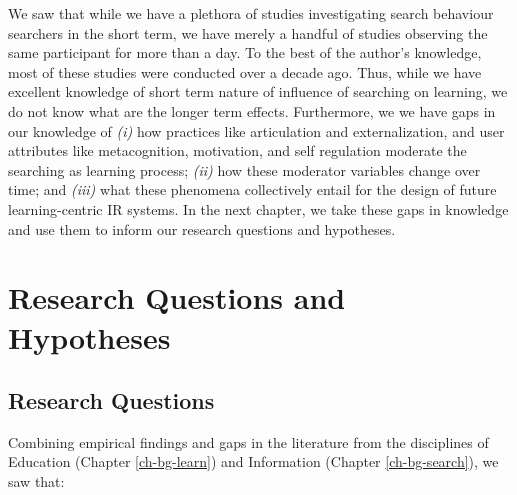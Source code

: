 \documentclass[letterpaper, nobind]{templates/ociamthesis}
\begin{document}
We saw that while we have a plethora of studies investigating search
behaviour searchers in the short term, we have merely a handful of
studies observing the same participant for more than a day. To the best
of the author's knowledge, most of these studies were conducted over a
decade ago. Thus, while we have excellent knowledge of short term nature
of influence of searching on learning, we do not know what are the
longer term effects. Furthermore, we we have gaps in our knowledge of
\emph{(i)} how practices like articulation and externalization, and user
attributes like metacognition, motivation, and self regulation moderate
the searching as learning process; \emph{(ii)} how these moderator variables
change over time; and \emph{(iii)} what these phenomena collectively entail
for the design of future learning-centric IR systems. In the next
chapter, we take these gaps in knowledge and use them to inform our
research questions and hypotheses.

\hypertarget{ch-rq}{%
\chapter{Research Questions and Hypotheses}\label{ch-rq}}

\hypertarget{sec-rq}{%
\section{Research Questions}\label{sec-rq}}

Combining empirical findings and gaps in the literature from the disciplines of Education (Chapter \ref{ch-bg-learn}) and Information (Chapter \ref{ch-bg-search}), we saw that:
\end{document}
